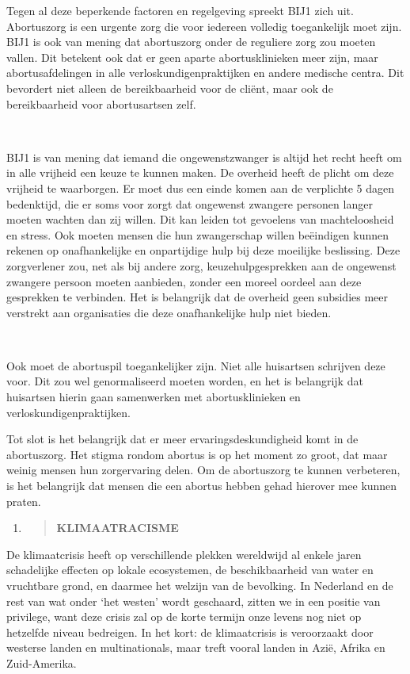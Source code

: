 Tegen al deze beperkende factoren en regelgeving spreekt BIJ1 zich uit.
Abortuszorg is een urgente zorg die voor iedereen volledig toegankelijk
moet zijn. BIJ1 is ook van mening dat abortuszorg onder de reguliere
zorg zou moeten vallen. Dit betekent ook dat er geen aparte
abortusklinieken meer zijn, maar abortusafdelingen in alle
verloskundigenpraktijken en andere medische centra. Dit bevordert niet
alleen de bereikbaarheid voor de cliënt, maar ook de bereikbaarheid voor
abortusartsen zelf.~

~

BIJ1 is van mening dat iemand die ongewenstzwanger is altijd het recht
heeft om in alle vrijheid een keuze te kunnen maken. De overheid heeft
de plicht om deze vrijheid te waarborgen. Er moet dus een einde komen
aan de verplichte 5 dagen bedenktijd, die er soms voor zorgt dat
ongewenst zwangere personen langer moeten wachten dan zij willen. Dit
kan leiden tot gevoelens van machteloosheid en stress. Ook moeten mensen
die hun zwangerschap willen beëindigen kunnen rekenen op onafhankelijke
en onpartijdige hulp bij deze moeilijke beslissing. Deze zorgverlener
zou, net als bij andere zorg, keuzehulpgesprekken aan de ongewenst
zwangere persoon moeten aanbieden, zonder een moreel oordeel aan deze
gesprekken te verbinden. Het is belangrijk dat de overheid geen
subsidies meer verstrekt aan organisaties die deze onafhankelijke hulp
niet bieden.

~

Ook moet de abortuspil toegankelijker zijn. Niet alle huisartsen
schrijven deze voor. Dit zou wel genormaliseerd moeten worden, en het is
belangrijk dat huisartsen hierin gaan samenwerken met abortusklinieken
en verloskundigenpraktijken.

Tot slot is het belangrijk dat er meer ervaringsdeskundigheid komt in de
abortuszorg. Het stigma rondom abortus is op het moment zo groot, dat
maar weinig mensen hun zorgervaring delen. Om de abortuszorg te kunnen
verbeteren, is het belangrijk dat mensen die een abortus hebben gehad
hierover mee kunnen praten.

\begin{enumerate}
\def\labelenumi{\arabic{enumi}.}
\setcounter{enumi}{14}
\item
  \begin{quote}
  \textbf{KLIMAATRACISME}
  \end{quote}
\end{enumerate}

De klimaatcrisis heeft op verschillende plekken wereldwijd al enkele
jaren schadelijke effecten op lokale ecosystemen, de beschikbaarheid van
water en vruchtbare grond, en daarmee het welzijn van de bevolking. In
Nederland en de rest van wat onder `het westen' wordt geschaard, zitten
we in een positie van privilege, want deze crisis zal op de korte
termijn onze levens nog niet op hetzelfde niveau bedreigen. In het kort:
de klimaatcrisis is veroorzaakt door westerse landen en multinationals,
maar treft vooral landen in Azië, Afrika en Zuid-Amerika.

